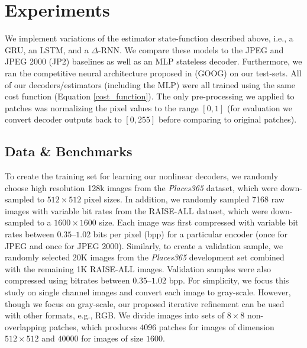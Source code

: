 \documentclass[smallabstract,smallcaptions]{dccpaper}
\begin{document}
\section{Experiments}
\label{experiments}
We implement variations of the estimator state-function described above, i.e., a GRU, an LSTM, and a $\Delta$-RNN.
We compare these models to the JPEG and JPEG 2000 (JP2) baselines as well as an MLP stateless decoder.  Furthermore, we ran the competitive neural architecture proposed in \cite{toderici2016full} (GOOG) on our test-sets. All of our decoders/estimators (including the MLP) were all trained using the same cost function (Equation \ref{cost_function}). The only pre-processing we applied to patches was normalizing the pixel values to the range $[0,1]$ (for evaluation we convert decoder outputs back to $[0,255]$ before comparing to original patches).

\subsection{Data \& Benchmarks}
\label{exp:data}
To create the training set for learning our nonlinear decoders, we randomly choose high resolution 128k images from the \emph{Places365}{\cite{zhou2017places}} dataset, which were down-sampled to $512\times512$ pixel sizes. In addition, we randomly sampled 7168 raw images with variable bit rates from the RAISE-ALL{\cite{Raise}} dataset, which were down-sampled to a $1600\times1600$ size. Each image was first compressed with variable bit rates between $0.35$--$1.02$ bits per pixel (bpp) for a particular encoder (once for JPEG and once for JPEG 2000). Similarly, to create a validation sample, we randomly selected 20K images from the \emph{Places365} development set combined with the remaining 1K RAISE-ALL images. Validation samples were also compressed using bitrates between $0.35$--$1.02$ bpp.
For simplicity, we focus this study on single channel images and convert each image to gray-scale. However, though we focus on gray-scale, our proposed iterative refinement can be used with other formats, e.g., RGB. We divide images into sets of $8\times8$ non-overlapping patches, which produces $4096$ patches for images of dimension $512\times512$ and $40000$ for images of size $1600$.
\end{document}
